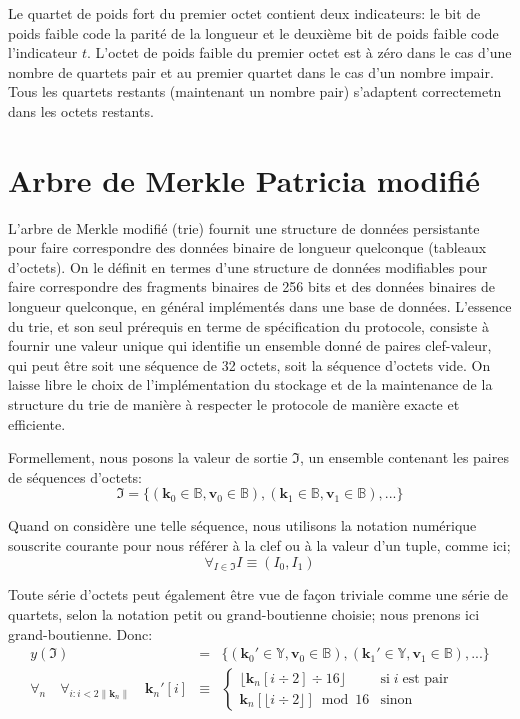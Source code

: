 \documentclass[9pt,oneside]{amsart}
\begin{document}
Le quartet de poids fort du premier octet contient deux indicateurs: le bit de poids faible code la parité de la longueur et le deuxième bit de poids faible code l'indicateur $t$. L'octet de poids faible du premier octet est à zéro dans le cas d'une nombre de quartets pair et au premier quartet dans le cas d'un nombre impair. Tous les quartets restants (maintenant un nombre pair) s'adaptent correctemetn dans les octets restants.

\section{Arbre de Merkle Patricia modifié}\label{app:trie}
L'arbre de Merkle modifié (trie) fournit une structure de données persistante pour faire correspondre des données binaire de longueur quelconque (tableaux d'octets). On le définit en termes d'une structure de données modifiables pour faire correspondre des fragments binaires de 256 bits et des données binaires de longueur quelconque, en général implémentés dans une base de données. L'essence du trie, et son seul prérequis en terme de spécification du protocole, consiste à fournir une valeur unique qui identifie un ensemble donné de paires clef-valeur, qui peut être soit une séquence de 32 octets, soit la séquence d'octets vide. On laisse libre le choix de l'implémentation du stockage et de la maintenance de la structure du trie de manière à respecter le protocole de manière exacte et efficiente.

Formellement, nous posons la valeur de sortie $\mathfrak{I}$, un ensemble contenant les paires de séquences d'octets:
\begin{equation}
\mathfrak{I} = \{ (\mathbf{k}_0 \in \mathbb{B}, \mathbf{v}_0 \in \mathbb{B}), (\mathbf{k}_1 \in \mathbb{B}, \mathbf{v}_1 \in \mathbb{B}), ... \}
\end{equation}

Quand on considère une telle séquence, nous utilisons la notation numérique souscrite courante pour nous référer à la clef ou à la valeur d'un tuple, comme ici;
\begin{equation}
\forall_{I \in \mathfrak{I}} I \equiv (I_0, I_1)
\end{equation}

Toute série d'octets peut également être vue de façon triviale comme une série de quartets, selon la notation petit ou grand-boutienne choisie; nous prenons ici grand-boutienne. Donc:
\begin{eqnarray}
y(\mathfrak{I}) & = & \{ (\mathbf{k}_0' \in \mathbb{Y}, \mathbf{v}_0 \in \mathbb{B}), (\mathbf{k}_1' \in \mathbb{Y}, \mathbf{v}_1 \in \mathbb{B}), ... \} \\
\forall_n \quad \forall_{i: i < 2\lVert\mathbf{k}_n\rVert} \quad \mathbf{k}_n'[i] & \equiv &
\begin{cases}
\lfloor \mathbf{k}_n[i \div 2] \div 16 \rfloor & \text{si} \; i \; \text{est pair} \\
\mathbf{k}_n[\lfloor i \div 2 \rfloor] \bmod 16 & \text{sinon}
\end{cases}
\end{eqnarray}
\end{document}
